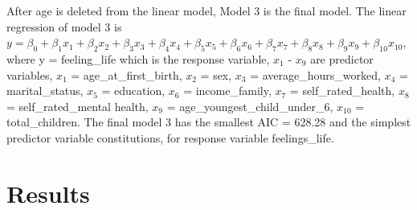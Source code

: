 \documentclass[
]{article}
\begin{document}
After age is deleted from the linear model, Model 3 is the final model.
The linear regression of model 3 is
\(y = \beta_{0} + \beta_{1}x_1 +\beta_{2}x_2 + \beta_{3}x_3 +\beta_{4}x_4 + \beta_{5}x_5 +\beta_{6}x_6 + \beta_{7}x_7 +\beta_{8}x_8 + \beta_{9}x_9 + \beta_{10}x_{10}\),
where y = feeling\_life which is the response variable, \(x_1\) -
\(x_9\) are predictor variables, \(x_1\) = age\_at\_first\_birth,
\(x_2\) = sex, \(x_3\) = average\_hours\_worked, \(x_4\) =
marital\_status, \(x_5\) = education, \(x_6\) = income\_family, \(x_7\)
= self\_rated\_health, \(x_8\) = self\_rated\_mental health, \(x_9\) =
age\_youngest\_child\_under\_6, \(x_{10}\) = total\_children. The final
model 3 has the smallest AIC = 628.28 and the simplest predictor
variable constitutions, for response variable feelings\_life.\\

\hypertarget{results}{%
\section{Results}\label{results}}
\end{document}

